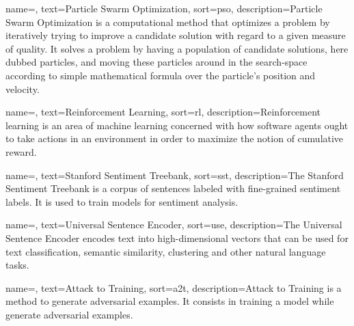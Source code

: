 {
    name=,
    text=Particle Swarm Optimization,
    sort=pso,
    description={Particle Swarm Optimization is a computational method that optimizes a problem by iteratively trying to improve a candidate solution with regard to a given measure of quality. It solves a problem by having a population of candidate solutions, here dubbed particles, and moving these particles around in the search-space according to simple mathematical formula over the particle's position and velocity.}
}

{
    name=,
    text=Reinforcement Learning,
    sort=rl,
    description={Reinforcement learning is an area of machine learning concerned with how software agents ought to take actions in an environment in order to maximize the notion of cumulative reward.}
}


{
    name=,
    text=Stanford Sentiment Treebank,
    sort=sst,
    description={The Stanford Sentiment Treebank is a corpus of sentences labeled with fine-grained sentiment labels. It is used to train models for sentiment analysis.}
}

{
    name=,
    text=Universal Sentence Encoder,
    sort=use,
    description={The Universal Sentence Encoder encodes text into high-dimensional vectors that can be used for text classification, semantic similarity, clustering and other natural language tasks.}
}

{
    name=,
    text=Attack to Training,
    sort=a2t,
    description={Attack to Training is a method to generate adversarial examples. It consists in training a model while generate adversarial examples.}
}





